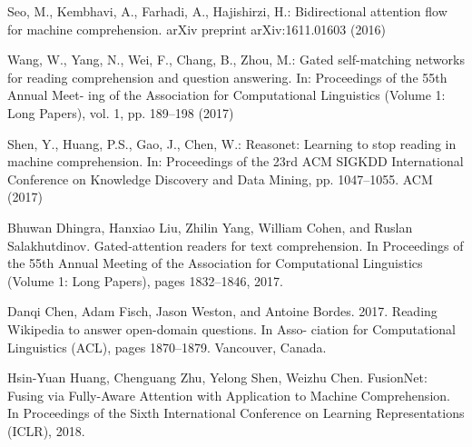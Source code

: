 \documentclass{article}
\begin{document}
\begin{multicols}{2}
\begin{thebibliography}{99}
    Seo, M., Kembhavi, A., Farhadi, A., Hajishirzi, H.: Bidirectional attention flow for machine
    comprehension. arXiv preprint arXiv:1611.01603 (2016)
    
    Wang, W., Yang, N., Wei, F., Chang, B., Zhou, M.: Gated self-matching networks for
    reading comprehension and question answering. In: Proceedings of the 55th Annual Meet-
    ing of the Association for Computational Linguistics (Volume 1: Long Papers), vol. 1, pp.
    189–198 (2017)

    Shen, Y., Huang, P.S., Gao, J., Chen, W.: Reasonet: Learning to stop reading in machine
    comprehension. In: Proceedings of the 23rd ACM SIGKDD International Conference on
    Knowledge Discovery and Data Mining, pp. 1047–1055. ACM (2017)

    Bhuwan Dhingra, Hanxiao Liu, Zhilin Yang, William Cohen, and Ruslan Salakhutdinov.
    Gated-attention readers for text comprehension. In Proceedings of the 55th Annual Meeting
    of the Association for Computational Linguistics (Volume 1: Long Papers), pages 1832–1846,
    2017.

    Danqi Chen, Adam Fisch, Jason Weston, and
    Antoine Bordes. 2017. Reading Wikipedia
    to answer open-domain questions. In Asso-
    ciation for Computational Linguistics (ACL),
    pages 1870–1879. Vancouver, Canada.

    Hsin-Yuan Huang, Chenguang Zhu, Yelong Shen, Weizhu Chen.
    FusionNet: Fusing via Fully-Aware Attention with Application to Machine Comprehension. In Proceedings of the 
    Sixth International Conference on Learning Representations (ICLR), 2018.


\end{thebibliography}
\end{multicols}
\end{document}
